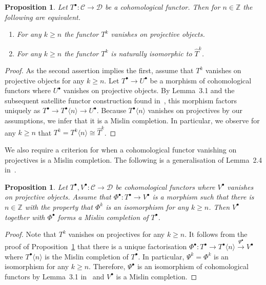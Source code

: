 \documentclass[12pt, a4paper]{article}
\numberwithin{equation}{section}
\newtheorem{prop}[thm]{Proposition}
\theoremstyle{empty}
\theoremstyle{nonumberplain}
\newtheorem{proof}{Proof}
\begin{document}
\begin{prop}\label{prop:mislincohomgroups}
Let $T^{\bullet}: \mathcal{C} \rightarrow \mathcal{D}$ be a cohomological functor. Then for $n \in \mathbb{Z}$ the following are equivalent.
\begin{enumerate}
\item For any $k \geq n$ the functor $T^k$ vanishes on projective objects.
\item For any $k \geq n$ the functor $T^k$ is naturally isomorphic to $\widehat{T}^k$.
\end{enumerate}
\end{prop}

\begin{proof}
As the second assertion implies the first, assume that $T^k$ vanishes on projective objects for any $k \geq n$. Let $T^{\bullet} \rightarrow U^{\bullet}$ be a morphism of cohomological functors where $U^{\bullet}$ vanishes on projective objects. By Lemma~3.1 and the subsequent satellite functor construction found in~\cite{ghe24}, this morphism factors uniquely as $T^{\bullet} \rightarrow T^{\bullet}\langle n \rangle \rightarrow U^{\bullet}$. Because $T^{\bullet}\langle n \rangle$ vanishes on projectives by our assumptions, we infer that it is a Mislin completion. In particular, we observe for any $k \geq n$ that $T^k = T^k \langle n \rangle \cong \widehat{T}^k$.
\end{proof}

We also require a criterion for when a cohomological functor vanishing on projectives is a Mislin completion. The following is a generalisation of Lemma~2.4 in~\cite{mis94}.

\begin{prop}\label{prop:detamislincompletion}
Let $T^{\bullet}, V^{\bullet}: \mathcal{C} \rightarrow \mathcal{D}$ be cohomological functors where $V^{\bullet}$ vanishes on projective objects. Assume that $\Phi^{\bullet}: T^{\bullet} \rightarrow V^{\bullet}$ is a morphism such that there is $n \in \mathbb{Z}$ with the property that $\Phi^k$ is an isomorphism for any $k \geq n$. Then $V^{\bullet}$ together with $\Phi^{\bullet}$ forms a Mislin completion of $T^{\bullet}$.
\end{prop}

\begin{proof}
Note that $T^k$ vanishes on projectives for any $k \geq n$. It follows from the proof of Proposition~\ref{prop:mislincohomgroups} that there is a unique factorisation $\Phi^{\bullet}: T^{\bullet} \rightarrow T^{\bullet}\langle n \rangle \xrightarrow{\Psi^{\bullet}} V^{\bullet}$ where $T^{\bullet}\langle n \rangle$ is the Mislin completion of $T^{\bullet}$. In particular, $\Psi^k = \Phi^k$ is an isomorphism for any $k \geq n$. Therefore, $\Psi^{\bullet}$ is an isomorphism of cohomological functors by Lemma~3.1 in~\cite{ghe24} and $V^{\bullet}$ is a Mislin completion.
\end{proof}
\end{document}
